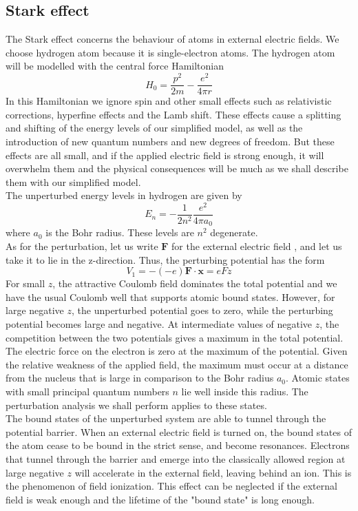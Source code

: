 \subsection{Stark effect}
The Stark effect concerns the behaviour of atoms in external electric fields. We choose hydrogen atom because it is single-electron atoms.
The hydrogen atom will be modelled with the central force Hamiltonian
\[H_0 = \frac{p^2}{2m} - \frac{e^2}{4\pi r}\]
In this Hamiltonian we ignore spin and other small effects such as relativistic corrections, hyperfine effects and the Lamb shift. These effects cause a splitting and shifting of the energy levels of our simplified model, as well as the introduction of new quantum numbers and new degrees of freedom.
But these effects are all small, and if the applied electric field is strong enough, it will overwhelm them and the physical consequences will be much as we shall describe them with our simplified model. \\
The unperturbed energy levels in hydrogen are given by
\[E_n = -\frac{1}{2n^2} \frac{e^2}{4\pi a_0}\]
where $a_0$ is the Bohr radius. These levels are $n^2$ degenerate.\\
As for the perturbation, let us write $\bm{F}$ for the external electric field , and let us take it to lie in the z-direction. Thus, the perturbing potential has the form
\[V_1 = -(-e)\bm{F}\cdot\bm{x} = eFz\]
For small $z$, the attractive Coulomb field dominates the total potential and we have the usual Coulomb well that supports atomic bound states. However, for large negative $z$, the unperturbed potential goes to zero, while the perturbing
potential becomes large and negative. At intermediate values of negative $z$, the competition between the two potentials gives a maximum in the total potential. The electric force on the electron is zero at the maximum of the potential. 
Given the relative weakness of the applied field, the maximum must occur at a distance from the nucleus that is large in comparison to the Bohr radius $a_0$. Atomic states with small principal quantum numbers $n$ lie well inside this radius. The perturbation analysis we shall perform applies to these states.\\
The bound states of the unperturbed system are able to tunnel through the potential barrier. When an external electric field is turned on, the bound states of the atom cease to be bound in the strict sense, and become resonances. 
Electrons that tunnel through the barrier and emerge into the classically allowed region at large negative $z$ will accelerate in the external field, leaving behind an ion. This is the phenomenon of field ionization. This effect can be neglected if the external field is weak enough and the lifetime of the "bound state" is long enough.\\ \\
